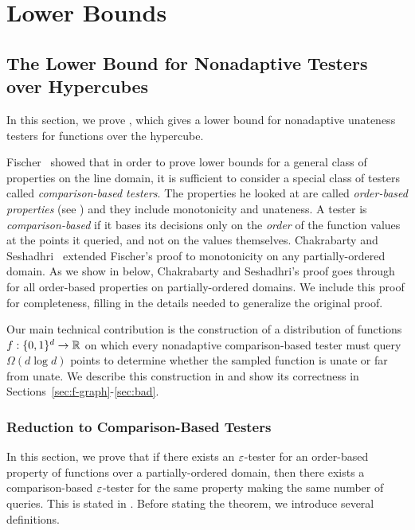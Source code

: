 \chapter{Lower Bounds}

\section{The Lower Bound for Nonadaptive Testers over Hypercubes} \label{sec:lb}
In this section, we prove , which gives a lower bound for nonadaptive unateness testers for functions over the hypercube.

Fischer~\cite{Fis04} showed that in order to prove lower bounds for a general class of properties on the line domain, it is sufficient to consider a special class of testers called {\em comparison-based testers}. The properties he looked at are called {\em order-based properties} (see ) and they include monotonicity and unateness.
A tester is {\em comparison-based} if it bases its decisions only on the {\em order} of the function values at the points it queried,  and not on the values themselves.
Chakrabarty and Seshadhri~\cite{CS14} extended Fischer's proof to monotonicity on any partially-ordered domain. As we show in  below, Chakrabarty and Seshadhri's proof goes through for all order-based properties on partially-ordered domains. We include this proof for completeness, filling in the details needed to generalize the original proof.

Our main technical contribution is the construction of a distribution of functions $f:\{0,1\}^d \to {\mathbb R}$ on which every nonadaptive comparison-based tester must query $\Omega(d \log d)$ points to determine whether the sampled function is unate or far from unate.
We describe this construction in  and show its correctness in Sections~\ref{sec:f-graph}-\ref{sec:bad}.

\subsection{Reduction to Comparison-Based Testers}\label{sec:reduction-cbt}
In this section, we prove that if there exists an $\varepsilon$-tester for an order-based property of functions over a partially-ordered domain, then there exists a comparison-based $\varepsilon$-tester for the same property making the same number of queries. This is stated in .
Before stating the theorem, we introduce several definitions.

